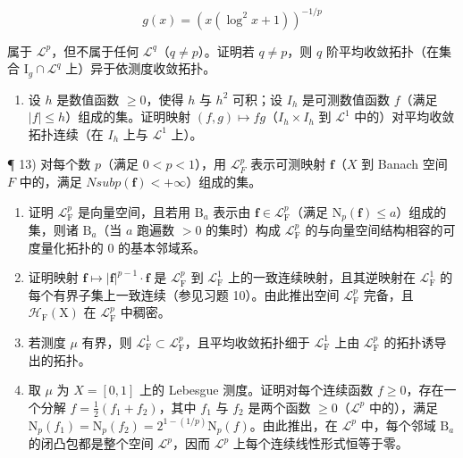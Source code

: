 \[
g (x) = \left(x (\log^ {2} x + 1)\right) ^ {- 1 / p}
\]

属于 \(\mathcal{L}^p\)，但不属于任何 \(\mathcal{L}^q\)（\(q \neq p\)）。证明若 \(q \neq p\)，则 \(q\) 阶平均收敛拓扑（在集合 \(\mathrm{I}_g \cap \mathcal{L}^q\) 上）异于依测度收敛拓扑。

\begin{enumerate}
\def\labelenumi{\arabic{enumi})}
\setcounter{enumi}{11}
\tightlist
\item
  设 \(h\) 是数值函数 \(\geqslant 0\)，使得 \(h\) 与 \(h^2\) 可积；设 \(I_h\) 是可测数值函数 \(f\)（满足 \(|f| \leqslant h\)）组成的集。证明映射 \((f, g) \mapsto fg\)（\(I_h \times I_h\) 到 \(\mathcal{L}^1\) 中的）对平均收敛拓扑连续（在 \(I_h\) 上与 \(\mathcal{L}^1\) 上）。
\end{enumerate}

¶ 13) 对每个数 \(p\)（满足 \(0 < p < 1\)），用 \(\mathcal{L}_F^p\) 表示可测映射 \(\mathbf{f}\)（\(X\) 到 Banach 空间 \(F\) 中的，满足 \(N sub p(\mathbf{f}) < +\infty\)）组成的集。

\begin{enumerate}
\def\labelenumi{\alph{enumi})}
\item
  证明 \(\mathcal{L}_{\mathrm{F}}^{p}\) 是向量空间，且若用 \(\mathrm{B}_a\) 表示由 \(\mathbf{f} \in \mathcal{L}_{\mathrm{F}}^{p}\)（满足 \(\mathrm{N}_p(\mathbf{f}) \leqslant a\)）组成的集，则诸 \(\mathrm{B}_a\)（当 \(a\) 跑遍数 \(>0\) 的集时）构成 \(\mathcal{L}_{\mathrm{F}}^{p}\) 的与向量空间结构相容的可度量化拓扑的 0 的基本邻域系。
\item
  证明映射 \(\mathbf{f} \mapsto |\mathbf{f}|^{p-1} \cdot \mathbf{f}\) 是 \(\mathcal{L}_{\mathrm{F}}^{p}\) 到 \(\mathcal{L}_{\mathrm{F}}^{1}\) 上的一致连续映射，且其逆映射在 \(\mathcal{L}_{\mathrm{F}}^{1}\) 的每个有界子集上一致连续（参见习题 10）。由此推出空间 \(\mathcal{L}_{\mathrm{F}}^{p}\) 完备，且 \(\mathcal{H}_{\mathrm{F}}(\mathrm{X})\) 在 \(\mathcal{L}_{\mathrm{F}}^{p}\) 中稠密。
\item
  若测度 \(\mu\) 有界，则 \(\mathcal{L}_{\mathrm{F}}^{1} \subset \mathcal{L}_{\mathrm{F}}^{p}\)，且平均收敛拓扑细于 \(\mathcal{L}_{\mathrm{F}}^{1}\) 上由 \(\mathcal{L}_{\mathrm{F}}^{p}\) 的拓扑诱导出的拓扑。
\item
  取 \(\mu\) 为 \(X = [0,1]\) 上的 Lebesgue 测度。证明对每个连续函数 \(f \geqslant 0\)，存在一个分解 \(f = \frac{1}{2}(f_1 + f_2)\)，其中 \(f_1\) 与 \(f_2\) 是两个函数 \(\geqslant 0\)（\(\mathcal{L}^p\) 中的），满足 \(\mathrm{N}_p(f_1) = \mathrm{N}_p(f_2) = 2^{1 - (1/p)}\mathrm{N}_p(f)\)。由此推出，在 \(\mathcal{L}^p\) 中，每个邻域 \(\mathrm{B}_a\) 的闭凸包都是整个空间 \(\mathcal{L}^p\)，因而 \(\mathcal{L}^p\) 上每个连续线性形式恒等于零。
\end{enumerate}


